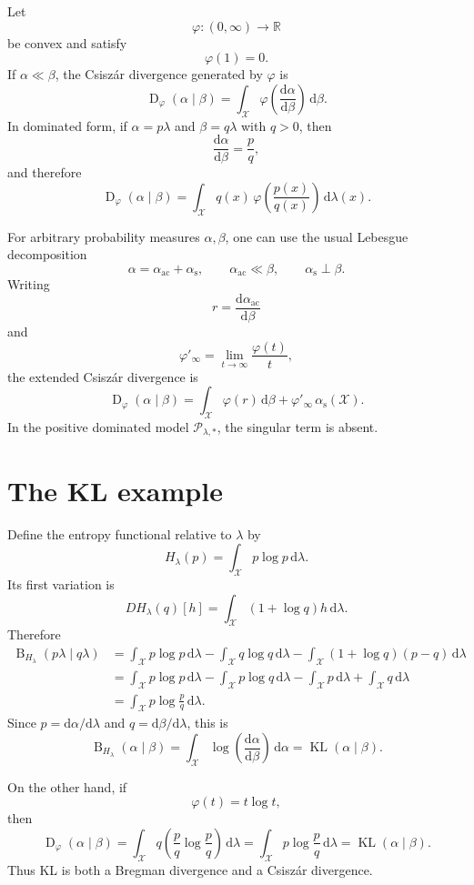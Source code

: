 \documentclass[11pt]{article}
\newcommand{\X}{\mathcal X}
\newcommand{\Pcal}{\mathcal P}
\newcommand{\KL}{\operatorname{KL}}
\newcommand{\Breg}{\operatorname{B}}
\newcommand{\Dphi}{\operatorname{D}}
\newcommand{\dd}{\mathrm d}
\newcommand{\1}{\mathbf 1}
\begin{document}
Let
\[
\varphi:(0,\infty)\to\mathbb R
\]
be convex and satisfy
\[
\varphi(1)=0.
\]
If \(\alpha\ll\beta\), the Csisz\'ar divergence generated by \(\varphi\) is
\[
\Dphi_\varphi(\alpha\mid\beta)
=
\int_\X
\varphi\!\left(
\frac{\dd\alpha}{\dd\beta}
\right)
\,\dd\beta.
\]
In dominated form, if \(\alpha=p\lambda\) and \(\beta=q\lambda\) with
\(q>0\), then
\[
\frac{\dd\alpha}{\dd\beta}
=
\frac{p}{q},
\]
and therefore
\[
\Dphi_\varphi(\alpha\mid\beta)
=
\int_\X
q(x)\,
\varphi\!\left(
\frac{p(x)}{q(x)}
\right)
\,\dd\lambda(x).
\]

For arbitrary probability measures \(\alpha,\beta\), one can use the usual
Lebesgue decomposition
\[
\alpha=\alpha_{\mathrm{ac}}+\alpha_{\mathrm{s}},
\qquad
\alpha_{\mathrm{ac}}\ll\beta,
\qquad
\alpha_{\mathrm{s}}\perp\beta.
\]
Writing
\[
r=\frac{\dd\alpha_{\mathrm{ac}}}{\dd\beta}
\]
and
\[
\varphi'_\infty
=
\lim_{t\to\infty}\frac{\varphi(t)}{t},
\]
the extended Csisz\'ar divergence is
\[
\Dphi_\varphi(\alpha\mid\beta)
=
\int_\X \varphi(r)\,\dd\beta
+
\varphi'_\infty\,\alpha_{\mathrm{s}}(\X).
\]
In the positive dominated model \(\Pcal_{\lambda,*}\), the singular term is absent.

\section{The KL example}

Define the entropy functional relative to \(\lambda\) by
\[
H_\lambda(p)
=
\int_\X p\log p\,\dd\lambda.
\]
Its first variation is
\[
DH_\lambda(q)[h]
=
\int_\X (1+\log q)h\,\dd\lambda.
\]
Therefore
\begin{align*}
\Breg_{H_\lambda}(p\lambda\mid q\lambda)
&=
\int_\X p\log p\,\dd\lambda
-
\int_\X q\log q\,\dd\lambda
-
\int_\X (1+\log q)(p-q)\,\dd\lambda \\
&=
\int_\X p\log p\,\dd\lambda
-
\int_\X p\log q\,\dd\lambda
-
\int_\X p\,\dd\lambda
+
\int_\X q\,\dd\lambda \\
&=
\int_\X p\log\frac{p}{q}\,\dd\lambda.
\end{align*}
Since \(p=\dd\alpha/\dd\lambda\) and \(q=\dd\beta/\dd\lambda\), this is
\[
\Breg_{H_\lambda}(\alpha\mid\beta)
=
\int_\X
\log\!\left(
\frac{\dd\alpha}{\dd\beta}
\right)
\,\dd\alpha
=
\KL(\alpha\mid\beta).
\]

On the other hand, if
\[
\varphi(t)=t\log t,
\]
then
\[
\Dphi_\varphi(\alpha\mid\beta)
=
\int_\X
q
\left(
\frac{p}{q}\log\frac{p}{q}
\right)
\,\dd\lambda
=
\int_\X p\log\frac{p}{q}\,\dd\lambda
=
\KL(\alpha\mid\beta).
\]
Thus KL is both a Bregman divergence and a Csisz\'ar divergence.
\end{document}
